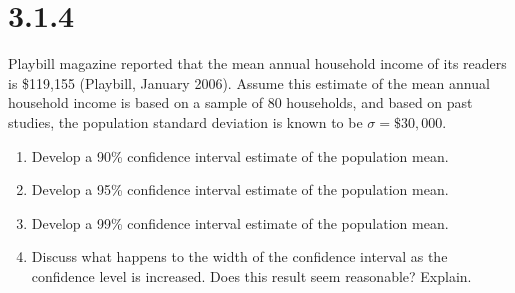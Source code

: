 \documentclass{article}
\begin{document}
\section*{3.1.4}
Playbill magazine reported that the mean annual household income of its readers is \$119,155 (Playbill, January 2006). Assume this estimate of the mean annual household income is based on a sample of 80 households, and based on past studies, the population standard deviation is known to be $\sigma = \$30,000$.
\begin{enumerate}
  \item Develop a 90\% confidence interval estimate of the population mean.
  \item Develop a 95\% confidence interval estimate of the population mean.
  \item Develop a 99\% confidence interval estimate of the population mean.
  \item Discuss what happens to the width of the confidence interval as the confidence level is increased. Does this result seem reasonable? Explain.
\end{enumerate}
\end{document}
